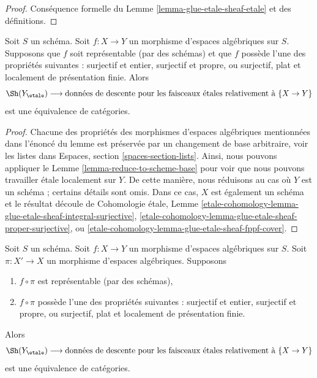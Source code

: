 \begin{proof}
Conséquence formelle du Lemme \ref{lemma-glue-etale-sheaf-etale}
et des définitions.
\end{proof}

\begin{lemma}
\label{lemma-representable-case}
Soit $S$ un schéma. Soit $f : X \to Y$ un morphisme d'espaces algébriques sur $S$. Supposons que $f$ soit représentable (par des schémas) et que $f$ possède l'une des propriétés suivantes :
surjectif et entier,
surjectif et propre, ou
surjectif, plat et localement de présentation finie.
Alors
$$
\Sh(Y_\etale)
\longrightarrow
\text{données de descente pour les faisceaux \'etales relativement à }\{X \to Y\}
$$
est une équivalence de catégories.
\end{lemma}

\begin{proof}
Chacune des propriétés des morphismes d'espaces algébriques
mentionnées dans l'énoncé du lemme est préservée par
un changement de base arbitraire, voir les listes dans
Espaces, section \ref{spaces-section-lists}.
Ainsi, nous pouvons appliquer le Lemme \ref{lemma-reduce-to-scheme-base}
pour voir que nous pouvons travailler \'etale localement sur $Y$.
De cette manière, nous réduisons au cas où $Y$ est un schéma ;
certains détails sont omis. Dans ce cas, $X$ est également un schéma
et le résultat découle de Cohomologie \'etale, Lemme
\ref{etale-cohomology-lemma-glue-etale-sheaf-integral-surjective},
\ref{etale-cohomology-lemma-glue-etale-sheaf-proper-surjective}, ou
\ref{etale-cohomology-lemma-glue-etale-sheaf-fppf-cover}.
\end{proof}

\begin{lemma}
\label{lemma-reduce-to-scheme-source}
Soit $S$ un schéma. Soit $f : X \to Y$ un morphisme d'espaces algébriques sur $S$. Soit $\pi : X' \to X$ un morphisme d'espaces algébriques. Supposons
\begin{enumerate}
\item $f \circ \pi$ est représentable (par des schémas),
\item $f \circ \pi$ possède l'une des propriétés suivantes :
surjectif et entier,
surjectif et propre, ou
surjectif, plat et localement de présentation finie.
\end{enumerate}
Alors
$$
\Sh(Y_\etale)
\longrightarrow
\text{données de descente pour les faisceaux \'etales relativement à }\{X \to Y\}
$$
est une équivalence de catégories.
\end{lemma}

